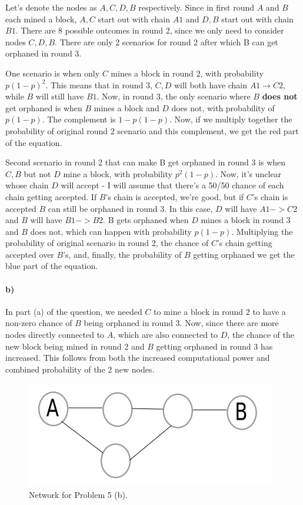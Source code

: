 \documentclass[10pt,letter]{article}
\begin{document}
Let's denote the nodes as $A, C, D, B$ respectively. Since in first round $A$ and $B$ each mined a block, $A, C$ start out with chain $A1$ and $D, B$ start out with chain $B1$. There are 8 possible outcomes in round 2, since we only need to consider nodes $C, D, B$. There are only 2 scenarios for round 2 after which B can get orphaned in round 3.

One scenario is when only $C$ mines a block in round 2, with probability $p(1-p)^2$. This means that in round 3, $C, D$ will both have chain $A1\rightarrow C2$, while $B$ will still have $B1$. Now, in round 3, the only scenario where $B$ \textbf{does not} get orphaned is when $B$ mines a block and $D$ does not, with probability of $p(1-p)$. The complement is $1 - p(1-p)$. Now, if we multiply together the probability of original round 2 scenario and this complement, we get the red part of the equation.

Second scenario in round 2 that can make B get orphaned in round 3 is when $C, B$ but not $D$ mine a block, with probability $p^2(1-p)$. Now, it's unclear whose chain $D$ will accept - I will assume that there's a 50/50 chance of each chain getting accepted. If $B$'s chain is accepted, we're good, but if $C$'s chain is accepted $B$ can still be orphaned in round 3. In this case, $D$ will have $A1->C2$ and $B$ will have $B1->B2$. B gets orphaned when $D$ mines a block in round 3 and $B$ does not, which can happen with probability $p(1-p)$. Multiplying the probability of original scenario in round 2, the chance of $C$'s chain getting accepted over $B$'s, and, finally, the probability of $B$ getting orphaned we get the blue part of the equation.

\paragraph{b)} In part (a) of the question, we needed $C$ to mine a block in round 2 to have a non-zero chance of $B$ being orphaned in round 3. Now, since there are more nodes directly connected to $A$, which are also connected to $D$, the chance of the new block being mined in round 2 and $B$ getting orphaned in round 3 has increased. This follows from both the increased computational power and combined probability of the 2 new nodes.

\begin{figure}[h!]
\centering
\includegraphics[scale=0.5,keepaspectratio]{hw8_problem5_b}
\caption{Network for Problem 5 (b).}
\end{figure}
\end{document}
